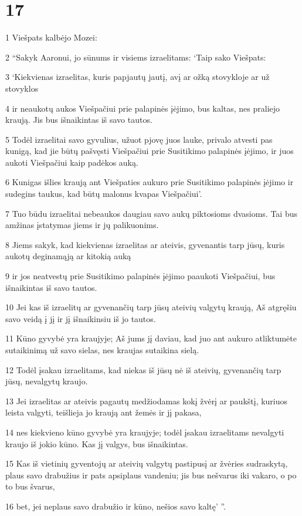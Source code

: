 \chapter{17}


\par 1 Viešpats kalbėjo Mozei: 
\par 2 “Sakyk Aaronui, jo sūnums ir visiems izraelitams: ‘Taip sako Viešpats: 
\par 3 ‘Kiekvienas izraelitas, kuris papjautų jautį, avį ar ožką stovykloje ar už stovyklos 
\par 4 ir neaukotų aukos Viešpačiui prie palapinės įėjimo, bus kaltas, nes praliejo kraują. Jis bus išnaikintas iš savo tautos. 
\par 5 Todėl izraelitai savo gyvulius, užuot pjovę juos lauke, privalo atvesti pas kunigą, kad jie būtų pašvęsti Viešpačiui prie Susitikimo palapinės įėjimo, ir juos aukoti Viešpačiui kaip padėkos auką. 
\par 6 Kunigas išlies kraują ant Viešpaties aukuro prie Susitikimo palapinės įėjimo ir sudegins taukus, kad būtų malonus kvapas Viešpačiui’. 
\par 7 Tuo būdu izraelitai nebeaukos daugiau savo aukų piktosioms dvasioms. Tai bus amžinas įstatymas jiems ir jų palikuonims. 
\par 8 Jiems sakyk, kad kiekvienas izraelitas ar ateivis, gyvenantis tarp jūsų, kuris aukotų deginamąją ar kitokią auką 
\par 9 ir jos neatvestų prie Susitikimo palapinės įėjimo paaukoti Viešpačiui, bus išnaikintas iš savo tautos. 
\par 10 Jei kas iš izraelitų ar gyvenančių tarp jūsų ateivių valgytų kraują, Aš atgręšiu savo veidą į jį ir jį išnaikinsiu iš jo tautos. 
\par 11 Kūno gyvybė yra kraujyje; Aš jums jį daviau, kad juo ant aukuro atliktumėte sutaikinimą už savo sielas, nes kraujas sutaikina sielą. 
\par 12 Todėl įsakau izraelitams, kad niekas iš jūsų nė iš ateivių, gyvenančių tarp jūsų, nevalgytų kraujo. 
\par 13 Jei izraelitas ar ateivis pagautų medžiodamas kokį žvėrį ar paukštį, kuriuos leista valgyti, teišlieja jo kraują ant žemės ir jį pakasa, 
\par 14 nes kiekvieno kūno gyvybė yra kraujyje; todėl įsakau izraelitams nevalgyti kraujo iš jokio kūno. Kas jį valgys, bus išnaikintas. 
\par 15 Kas iš vietinių gyventojų ar ateivių valgytų pastipusį ar žvėries sudraskytą, plaus savo drabužius ir pats apsiplaus vandeniu; jis bus nešvarus iki vakaro, o po to bus švarus, 
\par 16 bet, jei neplaus savo drabužio ir kūno, nešios savo kaltę’ ”.




